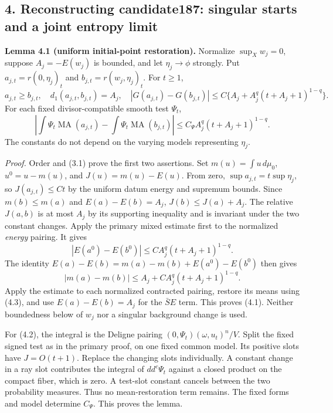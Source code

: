 \documentclass[
  11pt,
]{article}
\begin{document}
\subsection{4. Reconstructing candidate187: singular starts and a joint
entropy
limit}\label{reconstructing-candidate187-singular-starts-and-a-joint-entropy-limit}

\textbf{Lemma 4.1 (uniform initial-point restoration).} Normalize
\(\sup_Xw_j=0\), suppose \(A_j=-E(w_j)\) is bounded, and let
\(\eta_j\to\phi\) strongly. Put \(a_{j,t}=r(0,\eta_j)_t\) and
\(b_{j,t}=r(w_j,\eta_j)_t\). For \(t\geq1\), \[
 a_{j,t}\geq b_{j,t},\quad d_1(a_{j,t},b_{j,t})=A_j,
 \quad |G(a_{j,t})-G(b_{j,t})|
 \leq C\{A_j+A_j^q(t+A_j+1)^{1-q}\}. \tag{4.1}
\] For each fixed divisor-compatible smooth test \(\Psi_t\), \[
 \left|\int\Psi_t\operatorname{MA}(a_{j,t})
             -\int\Psi_t\operatorname{MA}(b_{j,t})\right|
 \leq C_\Psi A_j^q(t+A_j+1)^{1-q}. \tag{4.2}
\] The constants do not depend on the varying models representing
\(\eta_j\).

\emph{Proof.} Order and (3.1) prove the first two assertions. Set
\(m(u)=\int u\,d\mu_0\), \(u^0=u-m(u)\), and \(J(u)=m(u)-E(u)\). From
zero, \(\sup a_{j,t}=t\sup\eta_j\), so \(J(a_{j,t})\leq Ct\) by the
uniform datum energy and supremum bounds. Since \(m(b)\leq m(a)\) and
\(E(a)-E(b)=A_j\), \(J(b)\leq J(a)+A_j\). The relative \(J(a,b)\) is at
most \(A_j\) by its supporting inequality and is invariant under the two
constant changes. Apply the primary mixed estimate first to the
normalized \emph{energy} pairing. It gives \[
 |E(a^0)-E(b^0)|\leq C A_j^q(t+A_j+1)^{1-q}.
\] The identity \(E(a)-E(b)=m(a)-m(b)+E(a^0)-E(b^0)\) then gives
\[ |m(a)-m(b)|\leq A_j+C A_j^q(t+A_j+1)^{1-q}. \tag{4.3}\] Apply the
estimate to each normalized contracted pairing, restore its means using
(4.3), and use \(E(a)-E(b)=A_j\) for the \(\bar S E\) term. This proves
(4.1). Neither boundedness below of \(w_j\) nor a singular background
change is used.

For (4.2), the integral is the Deligne pairing
\((0,\Psi_t)(\omega,u_t)^n/V\). Split the fixed signed test as in the
primary proof, on one fixed common model. Its positive slots have
\(J=O(t+1)\). Replace the changing slots individually. A constant change
in a ray slot contributes the integral of \(dd^c\Psi_t\) against a
closed product on the compact fiber, which is zero. A test-slot constant
cancels between the two probability measures. Thus no mean-restoration
term remains. The fixed forms and model determine \(C_\Psi\). This
proves the lemma.
\end{document}
